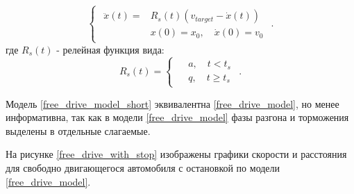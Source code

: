 \documentclass[12pt, a4paper]{extarticle}
\numberwithin{equation}{section}
\begin{document}
\begin{equation} \label{free_drive_model_short}
\begin{cases}
\begin{split}
\ddot{x}(t) = &R_s(t) \left(v_{target}-\dot{x}(t) \right) \\
&x(0)=x_0, \quad \dot{x}(0)=v_{0}
\end{split}
\end{cases}.
\end{equation}
где $R_s(t)$ - релейная функция вида:
\begin{equation*}
R_s(t)=
\begin{cases}
\begin{split}
&a, \quad t<t_{s} \\
&q, \quad t\geq t_{s}
\end{split}
\end{cases}.
\end{equation*}

Модель \eqref{free_drive_model_short} эквивалентна \eqref{free_drive_model}, но менее информативна, так как в модели \eqref{free_drive_model} фазы разгона и торможения выделены в отдельные слагаемые.

На рисунке \eqref{free_drive_with_stop} изображены графики скорости и расстояния для свободно двигающегося автомобиля с остановкой по модели \eqref{free_drive_model}.
\end{document}
